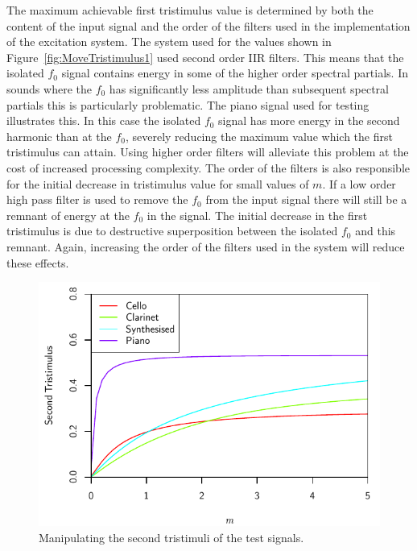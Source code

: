 		The maximum achievable first tristimulus value is determined by both the content of the input signal and
		the order of the filters used in the implementation of the excitation system. The system used for the
		values shown in Figure~\ref{fig:MoveTristimulus1} used second order IIR filters. This means that the
		isolated $f_{0}$ signal contains energy in some of the higher order spectral partials. In sounds where the
		$f_{0}$ has significantly less amplitude than subsequent spectral partials this is particularly
		problematic. The piano signal used for testing illustrates this. In this case the isolated $f_{0}$ signal
		has more energy in the second harmonic than at the $f_{0}$, severely reducing the maximum value which the
		first tristimulus can attain. Using higher order filters will alleviate this problem at the cost of
		increased processing complexity. The order of the filters is also responsible for the initial decrease in
		tristimulus value for small values of $m$. If a low order high pass filter is used to remove the $f_{0}$
		from the input signal there will still be a remnant of energy at the $f_{0}$ in the signal. The initial
		decrease in the first tristimulus is due to destructive superposition between the isolated $f_{0}$ and this
		remnant. Again, increasing the order of the filters used in the system will reduce these effects.

		\begin{figure}[h!]
			\centering
			\includegraphics{chapter6/Images/MoveTristimulus2.pdf}
			\caption{Manipulating the second tristimuli of the test signals.}
			\label{fig:MoveTristimulus2}
		\end{figure}

